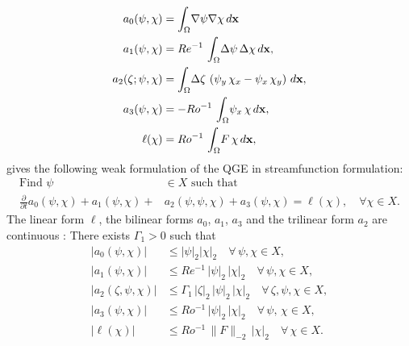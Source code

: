 \begin{align}
  a_0(\psi,\chi) &= \int_{\Omega}\! \nabla \psi \nabla \chi \, d\mathbf{x} \label{eqn:a0} \\
  a_1(\psi,\chi) &= Re^{-1} \, \int_{\Omega}\! \Delta \psi \, \Delta \chi \, d{\bf x} , \label{eqn:a1} \\
  a_2(\zeta;\psi,\chi) &= \int_{\Omega}\! \Delta \zeta \, \left( \psi_y \, \chi_x - \psi_x \, \chi_y \right) \, d{\bf x} , \label{eqn:a2} \\
  a_3(\psi,\chi) &= - Ro^{-1} \, \int_{\Omega}\! \psi_x \, \chi \, d{\bf x} , \label{eqn:a3} \\
  \ell(\chi) &= Ro^{-1} \, \int_{\Omega}\! F \, \chi \, d{\bf x} , \label{eqn:l}
\end{align}
gives the following weak formulation of the QGE in streamfunction formulation:
\begin{equation}
  \begin{split}
    \text{Find } \psi &\in X \text{ such that} \\
    \frac{\partial}{\partial t} a_0(\psi,\chi) + a_1(\psi,\chi) +& a_2(\psi,\psi,\chi) + a_3(\psi,\chi)
    = \ell(\chi),\quad \forall \chi \in X.
  \end{split}
  \label{eqn:QGEWF}
\end{equation}
The linear form $\ell$, the bilinear forms $a_0$, $a_1$, $a_3$ and the trilinear
form $a_2$ are continuous \cite{Cayco86}: There exists $\Gamma_1 > 0$ such that
\begin{align}
  |a_0(\psi,\chi)| &\le |\psi|_2 |\chi|_2 \quad \forall \, \psi,\chi\in X, \label{eqn:a0cont} \\
  |a_1(\psi,\chi)| &\le Re^{-1} \,  |\psi|_2 \, |\chi|_2 \quad \forall \, \psi,\chi\in X , \label{eqn:a1Cont} \\
  |a_2(\zeta,\psi,\chi)| &\le \Gamma_1 \, |\zeta|_2 \, |\psi|_2 \, |\chi|_2 \quad \forall \, \zeta,\psi,\chi\in X , \label{eqn:a2Cont} \\
  |a_3(\psi,\chi)| &\le Ro^{-1} \, |\psi|_2 \, |\chi|_2 \quad \forall \, \psi, \, \chi \in X , \label{eqn:a3Cont} \\
  |\ell(\chi)| &\le Ro^{-1} \,\|F\|_{-2} \, |\chi|_2 \quad \forall \, \chi \in X . \label{eqn:lCont}
\end{align}
